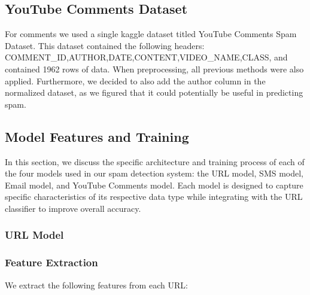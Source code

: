 \documentclass{article}
\begin{document}
\subsection*{YouTube Comments Dataset}
For comments we used a single kaggle dataset titled YouTube Comments Spam Dataset. This dataset contained the following headers: COMMENT\_ID,AUTHOR,DATE,CONTENT,VIDEO\_NAME,CLASS, and contained 1962 rows of data.
\newline
\newline
\noindent
When preprocessing, all previous methods were also applied. Furthermore, we decided to also add the author column in the normalized dataset, as we figured that it could potentially be useful in predicting spam.

\subsection{Model Features and Training}

In this section, we discuss the specific architecture and training process of each of the four models used in our spam detection system: the URL model, SMS model, Email model, and YouTube Comments model. Each model is designed to capture specific characteristics of its respective data type while integrating with the URL classifier to improve overall accuracy.

\subsubsection{URL Model}

\subsubsection*{Feature Extraction}

We extract the following features from each URL:
\end{document}
